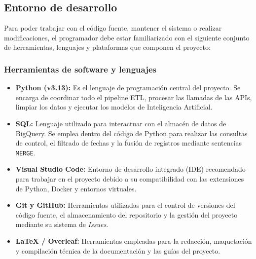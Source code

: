 \subsection{Entorno de desarrollo}
Para poder trabajar con el código fuente, mantener el sistema o realizar modificaciones, el programador debe estar familiarizado con el siguiente conjunto de herramientas, lenguajes y plataformas que componen el proyecto:
\subsubsection{Herramientas de software y lenguajes}
\begin{itemize}
    \item \textbf{Python (v3.13):} Es el lenguaje de programación central del proyecto. Se encarga de coordinar todo el pipeline ETL, procesar las llamadas de las APIs, limpiar los datos y ejecutar los modelos de Inteligencia Artificial.
    \item \textbf{SQL:} Lenguaje utilizado para interactuar con el almacén de datos de BigQuery. Se emplea dentro del código de Python para realizar las consultas de control, el filtrado de fechas y la fusión de registros mediante sentencias \texttt{MERGE}.
    \item \textbf{Visual Studio Code:} Entorno de desarrollo integrado (IDE) recomendado para trabajar en el proyecto debido a su compatibilidad con las extensiones de Python, Docker y entornos virtuales.
    \item \textbf{Git y GitHub:} Herramientas utilizadas para el control de versiones del código fuente, el almacenamiento del repositorio y la gestión del proyecto mediante su sistema de \textit{Issues}.
    \item \textbf{\LaTeX{} / Overleaf:} Herramientas empleadas para la redacción, maquetación y compilación técnica de la documentación y las guías del proyecto.
\end{itemize}

